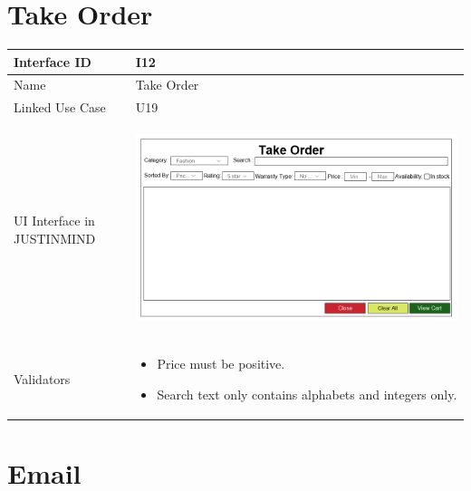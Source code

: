 \documentclass[12pt,a4paper]{report}
\begin{document}
\section{Take Order}

\begin{tabular}{ | m{3cm} | m{12cm}| } \hline

Interface ID & I12 \\\hline

Name  &  Take Order \\ \hline

Linked Use Case & U19	 \\ \hline

UI Interface in JUSTINMIND & \begin{center} \includegraphics[scale=0.3]{./User Interface/UI-011 Order Product@1x.png}\end{center}  \\ \hline

Validators & 
\begin{itemize}
\item   
Price must be positive.
\item 
Search text only contains alphabets and integers only.

\end{itemize}
\\ \hline

\end{tabular} 
\section{Email }
\end{document}
